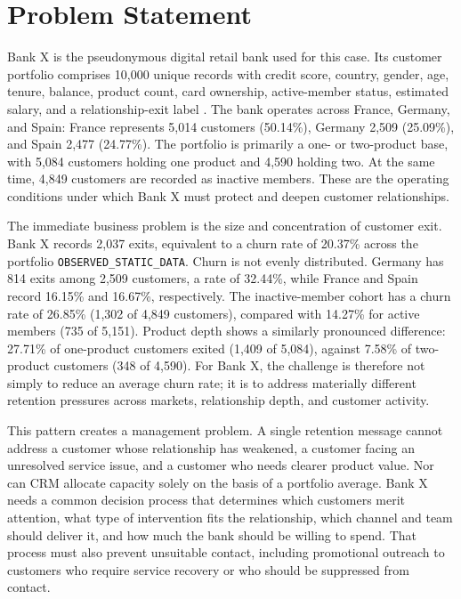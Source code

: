 \documentclass[a4paper,12pt]{article}
\newcommand{\observed}{\texttt{OBSERVED\_STATIC\_DATA}}
\begin{document}
\section{Problem Statement}

Bank X is the pseudonymous digital retail bank used for this case. Its customer portfolio comprises 10,000 unique records with credit score, country, gender, age, tenure, balance, product count, card ownership, active-member status, estimated salary, and a relationship-exit label \citep{topreKaggle}. The bank operates across France, Germany, and Spain: France represents 5,014 customers (50.14\%), Germany 2,509 (25.09\%), and Spain 2,477 (24.77\%). The portfolio is primarily a one- or two-product base, with 5,084 customers holding one product and 4,590 holding two. At the same time, 4,849 customers are recorded as inactive members. These are the operating conditions under which Bank X must protect and deepen customer relationships.

The immediate business problem is the size and concentration of customer exit. Bank X records 2,037 exits, equivalent to a churn rate of 20.37\% across the portfolio \observed. Churn is not evenly distributed. Germany has 814 exits among 2,509 customers, a rate of 32.44\%, while France and Spain record 16.15\% and 16.67\%, respectively. The inactive-member cohort has a churn rate of 26.85\% (1,302 of 4,849 customers), compared with 14.27\% for active members (735 of 5,151). Product depth shows a similarly pronounced difference: 27.71\% of one-product customers exited (1,409 of 5,084), against 7.58\% of two-product customers (348 of 4,590). For Bank X, the challenge is therefore not simply to reduce an average churn rate; it is to address materially different retention pressures across markets, relationship depth, and customer activity.

This pattern creates a management problem. A single retention message cannot address a customer whose relationship has weakened, a customer facing an unresolved service issue, and a customer who needs clearer product value. Nor can CRM allocate capacity solely on the basis of a portfolio average. Bank X needs a common decision process that determines which customers merit attention, what type of intervention fits the relationship, which channel and team should deliver it, and how much the bank should be willing to spend. That process must also prevent unsuitable contact, including promotional outreach to customers who require service recovery or who should be suppressed from contact.
\end{document}
